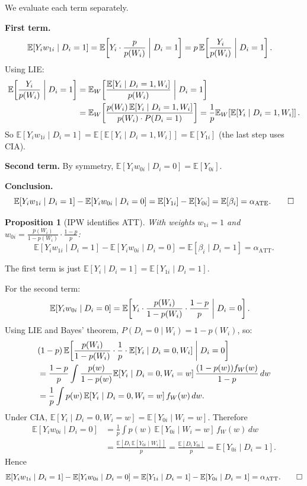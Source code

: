 \documentclass[12pt,a4paper]{article}
\theoremstyle{plain}
\newtheorem{propositio}{Proposition}[section]
\theoremstyle{definition}
\renewenvironment{proof}{\pushQED{\qed}\normalfont}{\popQED\par\nobreak}
\newcommand{\E}{\mathbb{E}}
\newcommand{\ATT}{\alpha_{\mathrm{ATT}}}
\newcommand{\ATE}{\alpha_{\mathrm{ATE}}}
\begin{document}
\begin{proof}
We evaluate each term separately.

\textbf{First term.}
\begin{align*}
  \E[Y_i w_{1i}\mid D_i=1]
  &= \E\!\left[Y_i\cdot\frac{p}{p(W_i)}\biggm| D_i=1\right]
   = p\,\E\!\left[\frac{Y_i}{p(W_i)}\biggm| D_i=1\right].
\end{align*}
Using LIE:
\begin{align*}
  \E\!\left[\frac{Y_i}{p(W_i)}\biggm| D_i=1\right]
  &= \E_W\!\left[\frac{\E[Y_i\mid D_i=1,W_i]}{p(W_i)}\biggm| D_i=1\right]\\
  &= \E_W\!\left[\frac{p(W_i)\,\E[Y_i\mid D_i=1,W_i]}{p(W_i)\cdot P(D_i=1)}\right]
   = \frac{1}{p}\E_W\!\left[\E[Y_i\mid D_i=1,W_i]\right].
\end{align*}
So $\E[Y_i w_{1i}\mid D_i=1] = \E\!\left[\E[Y_i\mid D_i=1,W_i]\right] = \E[Y_{1i}]$ (the last step uses CIA).

\textbf{Second term.}  By symmetry, $\E[Y_i w_{0i}\mid D_i=0]=\E[Y_{0i}]$.

\textbf{Conclusion.}
\[
  \E[Y_i w_{1i}\mid D_i=1]-\E[Y_i w_{0i}\mid D_i=0]
  = \E[Y_{1i}]-\E[Y_{0i}]
  = \E[\beta_i] = \ATE. \qedhere
\]
\end{proof}

\begin{propositio}[IPW identifies ATT\label{prop:ipw_att}]
With weights $w_{1i}=1$ and $w_{0i}=\frac{p(W_i)}{1-p(W_i)}\cdot\frac{1-p}{p}$:
\[
  \E[Y_i w_{1i}\mid D_i=1] - \E[Y_i w_{0i}\mid D_i=0] = \E[\beta_i\mid D_i=1] = \ATT.
\]
\end{propositio}

\begin{proof}
The first term is just $\E[Y_i\mid D_i=1]=\E[Y_{1i}\mid D_i=1]$.

For the second term:
\begin{align*}
  \E[Y_i w_{0i}\mid D_i=0]
  &= \E\!\left[Y_i\cdot\frac{p(W_i)}{1-p(W_i)}\cdot\frac{1-p}{p}\biggm| D_i=0\right].
\end{align*}
Using LIE and Bayes' theorem, $P(D_i=0\mid W_i)=1-p(W_i)$, so:
\begin{align*}
  &(1-p)\,\E\!\left[\frac{p(W_i)}{1-p(W_i)}\cdot\frac{1}{p}\cdot\E[Y_i\mid D_i=0,W_i]\biggm| D_i=0\right]\\
  &= \frac{1-p}{p}\int \frac{p(w)}{1-p(w)}\E[Y_i\mid D_i=0,W_i=w]\,\frac{(1-p(w))f_W(w)}{1-p}\,dw\\
  &= \frac{1}{p}\int p(w)\,\E[Y_i\mid D_i=0,W_i=w]\,f_W(w)\,dw.
\end{align*}
Under CIA, $\E[Y_i\mid D_i=0,W_i=w]=\E[Y_{0i}\mid W_i=w]$.  Therefore
\begin{align*}
  \E[Y_i w_{0i}\mid D_i=0]
  &= \frac{1}{p}\int p(w)\,\E[Y_{0i}\mid W_i=w]\,f_W(w)\,dw\\
  &= \frac{\E[D_i\,\E[Y_{0i}\mid W_i]]}{p}
   = \frac{\E[D_i\,Y_{0i}]}{p}
   = \E[Y_{0i}\mid D_i=1].
\end{align*}
Hence
\[
  \E[Y_i w_{1i}\mid D_i=1]-\E[Y_i w_{0i}\mid D_i=0]
  = \E[Y_{1i}\mid D_i=1]-\E[Y_{0i}\mid D_i=1]
  = \ATT. \qedhere
\]
\end{proof}
\end{document}
